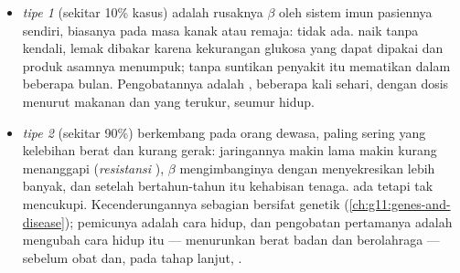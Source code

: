 \begin{proposition}\label{prop:g12:glucose-and-diabetes:types}
\begin{itemize}
  \item \emph{ tipe 1} (sekitar 10\% kasus) adalah rusaknya
         $\beta$ oleh sistem imun pasiennya sendiri, biasanya pada
        masa kanak atau remaja:  tidak ada.  naik
        tanpa kendali, lemak dibakar karena kekurangan glukosa yang
        dapat dipakai dan produk asamnya menumpuk; tanpa suntikan
         penyakit itu mematikan dalam beberapa bulan.
        Pengobatannya adalah , beberapa kali sehari, dengan
        dosis menurut makanan dan  yang terukur, seumur hidup.
  \item \emph{ tipe 2} (sekitar 90\%) berkembang pada orang
        dewasa, paling sering yang kelebihan berat dan kurang gerak:
        jaringannya makin lama makin kurang menanggapi 
        (\emph{resistansi }),  $\beta$ mengimbanginya dengan
        menyekresikan lebih banyak, dan setelah bertahun-tahun  itu
        kehabisan tenaga.  ada tetapi tak mencukupi.
        Kecenderungannya sebagian bersifat genetik
        (\cref{ch:g11:genes-and-disease}); pemicunya adalah cara hidup,
        dan pengobatan pertamanya adalah mengubah cara hidup itu ---
        menurunkan berat badan dan berolahraga --- sebelum obat dan,
        pada tahap lanjut, .
\end{itemize}
\end{proposition}
